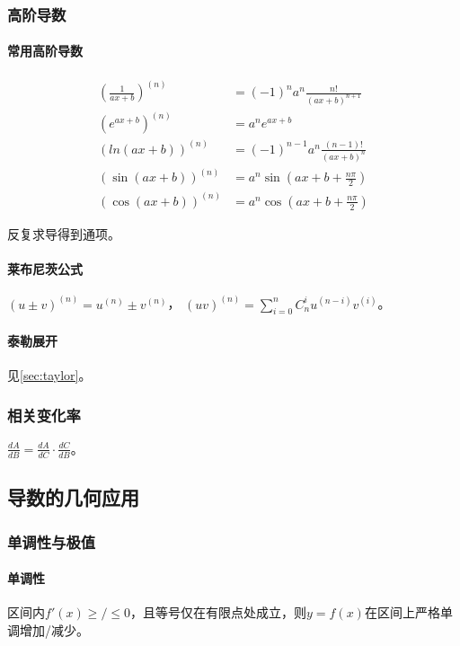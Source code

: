 \documentclass[
12pt, %
a4paper, 
oneside, %
headinclude,footinclude, %
]{scrartcl}
\begin{document}
\subsubsection[高阶导数]{高阶导数}
\paragraph{常用高阶导数}
\begin{align*}
(\frac{1}{ax + b})^{(n)} &= (-1)^n a^n \frac{n!}{(ax + b)^{n + 1}} \\
(e^{ax + b})^{(n)} &= a^n e^{ax + b} \\
(ln(ax + b))^{(n)} &= (-1)^{n - 1} a^n \frac{(n - 1)!}{(ax + b)^n} \\
(\sin(ax + b))^{(n)} &= a^n \sin(ax + b + \frac{n\pi}{2}) \\
(\cos(ax + b))^{(n)} &= a^n \cos(ax + b + \frac{n\pi}{2})
\end{align*}

反复求导得到通项。
\paragraph{莱布尼茨公式}
$ (u \pm v)^{(n)} = u^{(n)} \pm v^{(n)} $，
$ (uv)^{(n)} = \sum_{i = 0}^n C_n^i u^{(n - i)}v^{(i)} $。
\paragraph{泰勒展开}
见\ref{sec:taylor}。
\subsubsection[相关变化率]{相关变化率}
$ \frac{dA}{dB} = \frac{dA}{dC} \cdot \frac{dC}{dB} $。
\subsection[导数的几何应用]{导数的几何应用}
\subsubsection[单调性与极值]{单调性与极值}
\paragraph{单调性}
区间内$ f'(x) \geq/\leq 0 $，且等号仅在有限点处成立，则$ y = f(x) $在区间上严格单调增加/减少。
\end{document}
